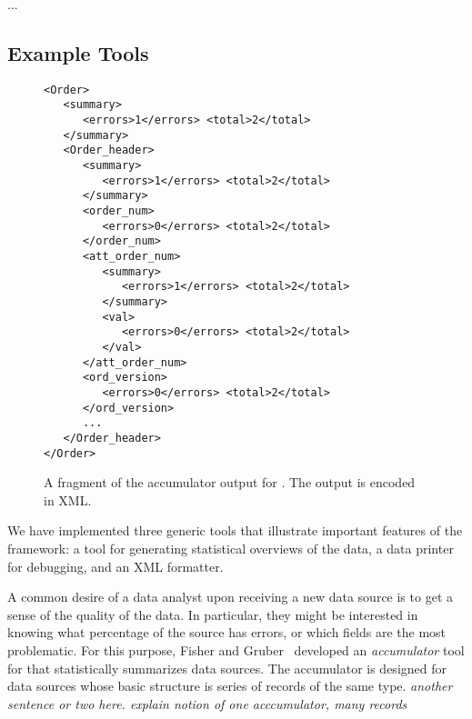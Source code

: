 ...

\subsection{Example Tools}
\label{sec:gentool-motivation-ex}


\begin{figure}
  \centering
  \scriptsize
\begin{verbatim}
<Order>
   <summary>
      <errors>1</errors> <total>2</total>        
   </summary>
   <Order_header>
      <summary>
         <errors>1</errors> <total>2</total>        
      </summary>
      <order_num>
         <errors>0</errors> <total>2</total>        
      </order_num>
      <att_order_num>
         <summary>
            <errors>1</errors> <total>2</total>        
         </summary>
         <val>
            <errors>0</errors> <total>2</total>                
         </val>
      </att_order_num>
      <ord_version>
         <errors>0</errors> <total>2</total>                
      </ord_version>
      ...
   </Order_header>
</Order>
\end{verbatim}  
  \caption{A fragment of the accumulator output for \dibbler{}. The
    output is encoded in XML.}
  \label{fig:gentool-acc-output}
\end{figure}

We have implemented three generic tools that illustrate important
features of the framework: a tool for generating statistical
overviews of the data, a data printer for debugging, and an XML
formatter.

A common desire of a data analyst upon receiving a new data source is
to get a sense of the quality of the data. In particular, they might
be interested in knowing what percentage of the source has errors, or
which fields are the most problematic. For this purpose, Fisher and
Gruber\padsc{}~\cite{fisher+:pads} developed an \emph{accumulator}
tool for \padsc{} that statistically summarizes data sources. The
accumulator is designed for data sources whose basic structure is
series of records of the same type. \emph{another sentence or two
  here. explain notion of one acccumulator,  many records}

